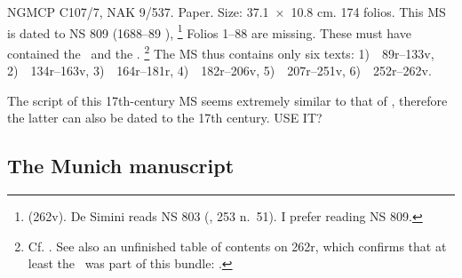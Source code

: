 \medskip

NGMCP C107/7, NAK 9/537. Paper. Size: 
37.1~×~10.8 cm. 174 folios. This MS is
dated to NS 809 (1688--89 \CE),%
		\footnote{ (\fol262v). 
		De Simini reads NS 803
		(\citeyear{DeSiminiMSSFromNepal2016}, 253 n.~51).
		I prefer reading NS 809. }
Folios 1--88 are missing. These must have contained the \SDhS\ and the \SDhU.%
			\footnote{Cf. 
				. 
				See also an unfinished table of contents on \fol262r,
				which confirms that at least the \SDhS\ was part 
				of this bundle: .}
The MS thus contains only six texts:
1)~\SDhSangr\ \fols89r--133v,
2)~\Ums\ \fols134r--163v,
3)~\SivaUp\ \fols164r--181r,
4)~\Uums\ \fols182r--206v,
5)~\Vss\ \fols207r--251v, %
6)~\DharmP\ \fols252r--262v. 

The script of this 17th-century MS seems 
extremely similar to that of \msPaperA, 
therefore the latter can also be
dated to the 17th century. USE IT? \CHECK



\medskip
\subsection{The Munich manuscript}

